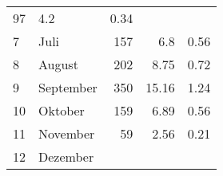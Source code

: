 \begin{longtable}{lXrrr}
       \num{97} &
       \num[round-mode=places,round-precision=2]{4,2} &
         \num[round-mode=places,round-precision=2]{0,34} \\

     7 &
     \multicolumn{1}{X}{ Juli   } &


       \num{157} &
       \num[round-mode=places,round-precision=2]{6,8} &
         \num[round-mode=places,round-precision=2]{0,56} \\

     8 &
     \multicolumn{1}{X}{ August   } &


       \num{202} &
       \num[round-mode=places,round-precision=2]{8,75} &
         \num[round-mode=places,round-precision=2]{0,72} \\

     9 &
     \multicolumn{1}{X}{ September   } &


       \num{350} &
       \num[round-mode=places,round-precision=2]{15,16} &
         \num[round-mode=places,round-precision=2]{1,24} \\

     10 &
     \multicolumn{1}{X}{ Oktober   } &


       \num{159} &
       \num[round-mode=places,round-precision=2]{6,89} &
         \num[round-mode=places,round-precision=2]{0,56} \\

     11 &
     \multicolumn{1}{X}{ November   } &


       \num{59} &
       \num[round-mode=places,round-precision=2]{2,56} &
         \num[round-mode=places,round-precision=2]{0,21} \\

     12 &
     \multicolumn{1}{X}{ Dezember   } &



\end{longtable}
